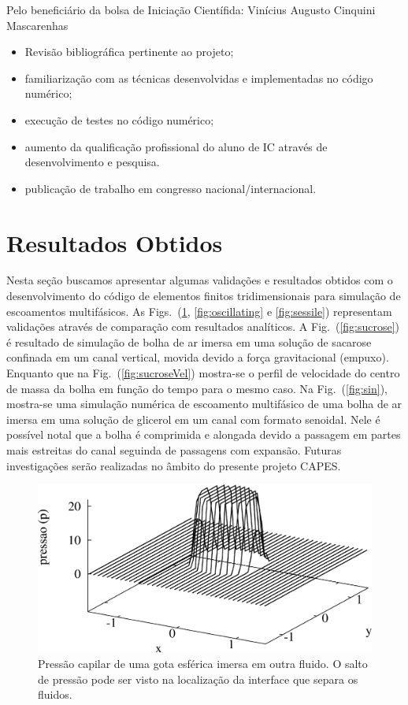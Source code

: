 \documentclass[a4paper,portuges,12pt]{article}
\begin{document}
Pelo beneficiário da bolsa de Iniciação Científida: Vinícius Augusto Cinquini Mascarenhas
\begin{itemize}
\item Revisão bibliográfica pertinente ao projeto;
\item familiarização com as técnicas desenvolvidas e implementadas no
código numérico;
\item execução de testes no código numérico;
\item aumento da qualificação profissional do aluno de IC através de
desenvolvimento e pesquisa.
\item publicação de trabalho em congresso nacional/internacional.
\end{itemize}

\section{Resultados Obtidos}

Nesta seção buscamos apresentar algumas validações e resultados obtidos
com o desenvolvimento do código de elementos finitos tridimensionais
para simulação de escoamentos multifásicos. As
Figs.~(\ref{fig:pressure3d}, \ref{fig:oscillating} e \ref{fig:sessile})
representam validações através de comparação com resultados analíticos.
A Fig.~(\ref{fig:sucrose}) é resultado de simulação de bolha de ar
imersa em uma solução de sacarose confinada em um canal vertical, movida
devido a força gravitacional (empuxo). Enquanto que na
Fig.~(\ref{fig:sucroseVel}) mostra-se o perfil de velocidade do centro
de massa da bolha em função do tempo para o mesmo caso. Na
Fig.~(\ref{fig:sin}), mostra-se uma simulação numérica de escoamento
multifásico de uma bolha de ar imersa em uma solução de glicerol em um
canal com formato senoidal. Nele é possível notal que a bolha é
comprimida e alongada devido a passagem em partes mais estreitas do
canal seguinda de passagens com expansão. Futuras investigações serão
realizadas no âmbito do presente projeto CAPES.

 \begin{figure}[h]
 	\begin{center}
 		\includegraphics[angle=0, scale=0.5]{figs/pressure3d.pdf}
 	\end{center}
 	\caption{Pressão capilar de uma gota esférica imersa em outra fluido. 
	O salto de pressão pode ser visto na localização da interface que
	separa os fluidos.}
 	\label{fig:pressure3d} 
 \end{figure}
\end{document}
